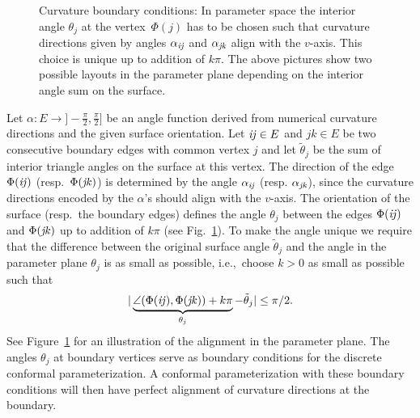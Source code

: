 \documentclass[twoside]{article}
\begin{document}
\begin{figure}[b]
\centering 

\caption{Curvature boundary conditions: In parameter space the interior angle 
$\theta_j$ at the vertex~$\Phi(j)$ has to be chosen such that curvature 
directions given by angles $\alpha_{\mathrm{\it{ij}}}$ and $\alpha_{\mathrm{\it{jk}}}$ align with the 
$v$-axis. This choice is unique up to addition
of $k \pi$. The above pictures show two possible layouts in the parameter
plane depending on the interior angle sum on the surface.}
\label{fig:boundary_angles}
\end{figure}


Let $\alpha:E\to ]-\frac{\pi}{2},\frac{\pi}{2}]$ be an angle function derived
from numerical curvature directions and the given surface orientation. 
Let $\mathrm{\it{ij}}\in E$ and $jk\in E$ be two consecutive boundary edges with common
vertex $j$ and let $\tilde\theta_j$ be the sum of interior triangle angles on
the surface at this vertex.  The direction of the edge $\Phi(\mathrm{\it{ij}})$ (resp.\
$\Phi(\mathrm{\it{jk}})$) is determined by the angle $\alpha_{\mathrm{\it{ij}}}$ 
(resp. $\alpha_{\mathrm{\it{jk}}}$),
since the curvature directions encoded by the $\alpha$'s should align with the
$v$-axis. The orientation of the surface (resp.\ the boundary edges) defines
the angle $\theta_j$ between the edges $\Phi(\mathrm{\it{ij}})$ and $\Phi(\mathrm{\it{jk}})$ up to
addition of $k \pi$ (see Fig.~\ref{fig:boundary_angles}). To make the angle
unique we require that the difference between the original surface angle
$\tilde\theta_j$ and the angle in the parameter plane $\theta_j$ is as small
as possible, i.e.,\ choose $k>0$ as small as possible such that 
\[
|\underbrace{\angle(\Phi(\mathrm{\it{ij}}),\Phi(\mathrm{\it{jk}}))+ k \pi}_{\theta_j} - \tilde\theta_j| \le \pi/2.
\]
See Figure~\ref{fig:boundary_angles} for an
illustration of the alignment in the parameter plane. The angles $\theta_j$ at
boundary vertices serve as boundary conditions for the discrete conformal
parameterization. A conformal parameterization with these boundary conditions
will then have perfect alignment of curvature directions at the boundary.
\end{document}
